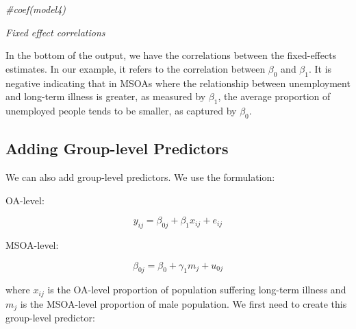 \documentclass[
]{book}
\newenvironment{Shaded}{\begin{snugshade}}{\end{snugshade}}
\newcommand{\CommentTok}[1]{\textcolor[rgb]{0.56,0.35,0.01}{\textit{#1}}}
\begin{document}
\begin{Shaded}
\begin{Highlighting}[]
\CommentTok{\#coef(model4)}
\end{Highlighting}
\end{Shaded}

\emph{Fixed effect correlations}

In the bottom of the output, we have the correlations between the fixed-effects estimates. In our example, it refers to the correlation between \(\beta_{0}\) and \(\beta_{1}\). It is negative indicating that in MSOAs where the relationship between unemployment and long-term illness is greater, as measured by \(\beta_{1}\), the average proportion of unemployed people tends to be smaller, as captured by \(\beta_{0}\).

\hypertarget{adding-group-level-predictors}{%
\subsection{Adding Group-level Predictors}\label{adding-group-level-predictors}}

We can also add group-level predictors. We use the formulation:

OA-level:

\[y_{ij} = \beta_{0j} + \beta_{1}x_{ij} + e_{ij}\]

MSOA-level:

\[\beta_{0j} = \beta_{0} + \gamma_{1}m_{j} + u_{0j}\]

where \(x_{ij}\) is the OA-level proportion of population suffering long-term illness and \(m_{j}\) is the MSOA-level proportion of male population. We first need to create this group-level predictor:
\end{document}
